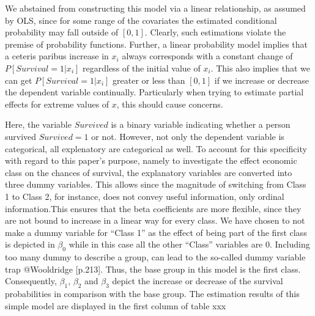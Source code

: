 \documentclass[
]{article}
\begin{document}
We abstained from constructing this model via a linear relationship, as
assumed by OLS, since for some range of the covariates the estimated
conditional probability may fall outside of \([0,1]\). Clearly, such
estimations violate the premise of probability functions. Further, a
linear probability model implies that a ceteris paribus increase in
\(x_i\) always corresponds with a constant change of
\(P[Survival=1|x_i]\) regardless of the initial value of \(x_i\). This
also implies that we can get \(P[Survival=1|x_i]\) greater or less than
\([0,1]\) if we increase or decrease the dependent variable continually.
Particularly when trying to estimate partial effects for extreme values
of \(x\), this should cause concerns.

Here, the variable \(Survived\) is a binary variable indicating whether
a person survived \(Survived = 1\) or not. However, not only the
dependent variable is categorical, all explenatory are categorical as
well. To account for this specificity with regard to this paper's
purpose, namely to investigate the effect economic class on the chances
of survival, the explanatory variables are converted into three dummy
variables. This allows since the magnitude of switching from Class 1 to
Class 2, for instance, does not convey useful information, only ordinal
information.This ensures that the beta coefficients are more flexible,
since they are not bound to increase in a linear way for every class. We
have chosen to not make a dummy variable for ``Class 1'' as the effect
of being part of the first class is depicted in \(\beta_0\) while in
this case all the other ``Class'' variables are 0. Including too many
dummy to describe a group, can lead to the so-called dummy variable trap
@Wooldridge {[}p.213{]}. Thus, the base group in this model is the first
class. Consequently, \(\beta_1\), \(\beta_2\) and \(\beta_3\) depict the
increase or decrease of the survival probabilities in comparison with
the base group. The estimation results of this simple model are
displayed in the first column of table xxx
\end{document}
